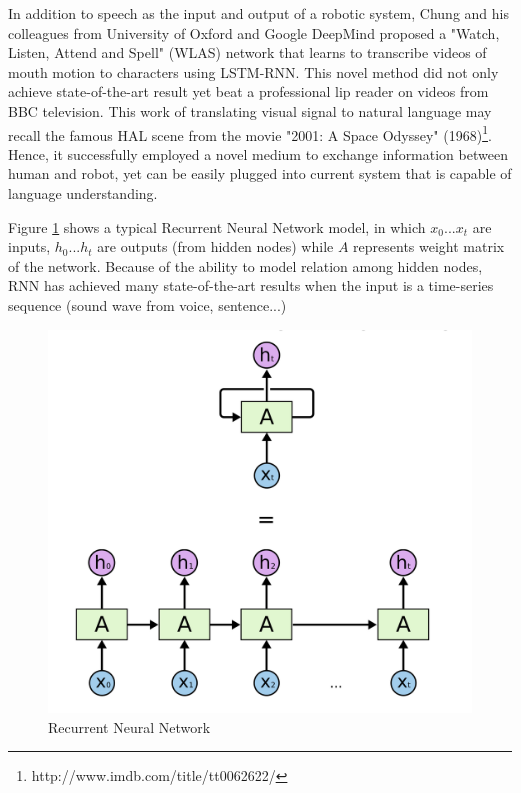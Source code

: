 \documentclass[10pt, a4paper]{article}
\begin{document}
In addition to speech as the input and output of a robotic system, Chung and his colleagues from University of Oxford and Google DeepMind proposed a "Watch, Listen, Attend and Spell" (WLAS) network \cite{chungSVZ16} that learns to transcribe videos of mouth motion to characters using LSTM-RNN. This novel method did not only achieve state-of-the-art result yet beat a professional lip reader on videos from BBC television. This work of translating visual signal to natural language may recall the famous HAL scene from the movie "2001: A Space Odyssey" (1968)\footnote{http://www.imdb.com/title/tt0062622/}. Hence, it successfully employed a novel medium to exchange information between human and robot, yet can be easily plugged into current system that is capable of language understanding.

Figure \ref{fig.1} shows a typical Recurrent Neural Network model, in which $x_0...x_t$ are inputs, $h_0...h_t$ are outputs (from hidden nodes) while $A$ represents weight matrix of the network. Because of the ability to model relation among hidden nodes, RNN has achieved many state-of-the-art results when the input is a time-series sequence (sound wave from voice, sentence...)
\begin{figure}[!h]
\begin{center}
\includegraphics[scale=0.15]{RNN-unrolled} 
\caption{Recurrent Neural Network}
\label{fig.1}
\end{center}
\end{figure}
\end{document}
